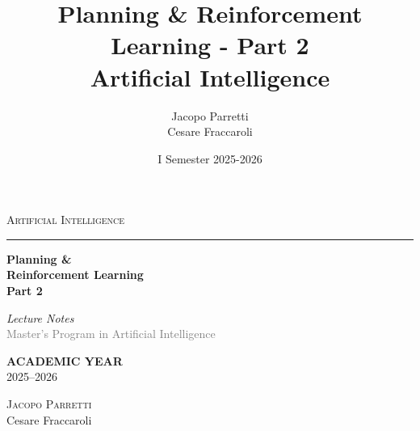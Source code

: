 \documentclass[11pt,a4paper]{article}
\title{\textbf{Planning \& Reinforcement Learning - Part 2}\\
\large Artificial Intelligence}
\author{Jacopo Parretti \\ Cesare Fraccaroli}
\date{I Semester 2025-2026}
\theoremstyle{definition}
\theoremstyle{plain}
\theoremstyle{remark}
\begin{document}
\begin{titlepage}
    \begin{center}
        \vspace*{2cm}

        {\large\textsc{Artificial Intelligence}}

        \vspace{0.4cm}
        \textcolor{blue!60!black}{\rule{0.5\textwidth}{1pt}}

        \vspace{2.5cm}

        {\fontsize{36}{44}\selectfont\bfseries Planning \&\\[0.5cm] Reinforcement Learning\\[0.5cm] Part 2}

        \vspace{1.5cm}

        \begin{tcolorbox}[
            colback=blue!3!white,
            colframe=blue!40!black,
            width=0.6\textwidth,
            arc=1mm,
            boxrule=0.8pt,
            left=15pt,
            right=15pt,
            top=10pt,
            bottom=10pt
        ]
            \centering
            {\large\textit{Lecture Notes}}\\[0.3cm]
            \textcolor{gray}{Master's Program in Artificial Intelligence}
        \end{tcolorbox}

        \vfill

        \begin{tcolorbox}[
            enhanced,
            colback=white,
            colframe=gray!30,
            width=0.5\textwidth,
            arc=0mm,
            boxrule=0.5pt,
            left=20pt,
            right=20pt,
            top=12pt,
            bottom=12pt,
            shadow={2mm}{-2mm}{0mm}{black!10}
        ]
            \centering
            {\small\textcolor{gray!70}{\textbf{ACADEMIC YEAR}}}\\[0.4cm]
            {\Large 2025--2026}
        \end{tcolorbox}

        \vspace{2cm}

        {\LARGE\textsc{Jacopo Parretti}\\[0.3cm]Cesare Fraccaroli}

        \vspace{1.5cm}

    \end{center}
\end{titlepage}
\end{document}
